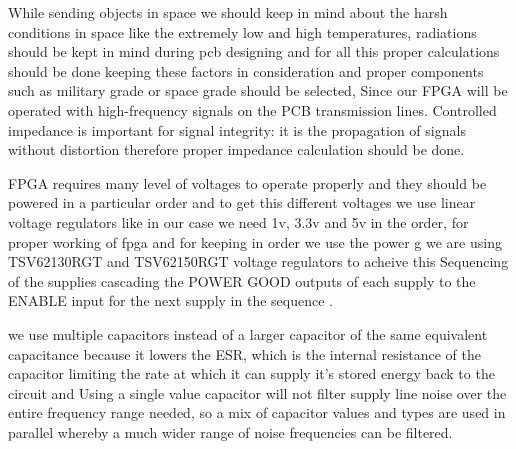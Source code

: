 \documentclass[../../main.tex]{subfiles}
\begin{document}
While sending objects in space we should keep in mind about the harsh conditions in space like the extremely low and high temperatures, radiations should be kept in mind during pcb designing and for all this proper calculations should be done keeping these factors in consideration and proper components such as military grade or space grade should be selected, Since our FPGA will be operated with high-frequency signals on the PCB transmission lines. Controlled impedance is important for signal integrity: it is the propagation of signals without distortion therefore proper impedance calculation should be done.

FPGA requires many level of voltages to operate properly and they should be powered in a particular order and to get this different voltages we use linear voltage regulators like in our case we need 1v, 3.3v and 5v in the order, for proper working of fpga and for keeping in order we use the power g we are using TSV62130RGT and TSV62150RGT voltage regulators to acheive this Sequencing of the supplies cascading the POWER GOOD outputs of each supply to the ENABLE input for the next supply in the sequence .

we use multiple capacitors instead of a larger capacitor of the same equivalent capacitance because it lowers the ESR, which is the internal resistance of the capacitor limiting the rate at which it can supply it's stored energy back to the circuit and Using a single value capacitor will not filter supply line noise over the entire frequency range needed, so a mix of capacitor values and types are used in parallel whereby a much wider range of noise frequencies can be filtered.
\end{document}
